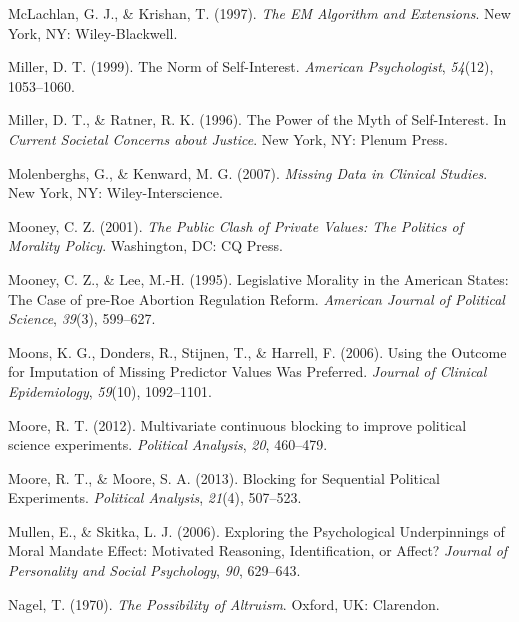 \documentclass[12pt,econ]{sources/authesis}
\begin{document}
\leavevmode\hypertarget{ref-mclachlan_1997_algorithm}{}%
McLachlan, G. J., \& Krishan, T. (1997). \emph{The EM Algorithm and Extensions}. New York, NY: Wiley-Blackwell.

\leavevmode\hypertarget{ref-miller_norm_1999}{}%
Miller, D. T. (1999). The Norm of Self-Interest. \emph{American Psychologist}, \emph{54}(12), 1053--1060.

\leavevmode\hypertarget{ref-miller_power_1996}{}%
Miller, D. T., \& Ratner, R. K. (1996). The Power of the Myth of Self-Interest. In \emph{Current Societal Concerns about Justice}. New York, NY: Plenum Press.

\leavevmode\hypertarget{ref-molenberghs_2007_missing}{}%
Molenberghs, G., \& Kenward, M. G. (2007). \emph{Missing Data in Clinical Studies}. New York, NY: Wiley-Interscience.

\leavevmode\hypertarget{ref-mooney_public_2001}{}%
Mooney, C. Z. (2001). \emph{The Public Clash of Private Values: The Politics of Morality Policy}. Washington, DC: CQ Press.

\leavevmode\hypertarget{ref-mooney_1995_legislative}{}%
Mooney, C. Z., \& Lee, M.-H. (1995). Legislative Morality in the American States: The Case of pre-Roe Abortion Regulation Reform. \emph{American Journal of Political Science}, \emph{39}(3), 599--627.

\leavevmode\hypertarget{ref-moons_2006_using}{}%
Moons, K. G., Donders, R., Stijnen, T., \& Harrell, F. (2006). Using the Outcome for Imputation of Missing Predictor Values Was Preferred. \emph{Journal of Clinical Epidemiology}, \emph{59}(10), 1092--1101.

\leavevmode\hypertarget{ref-moore_2012_multivariate}{}%
Moore, R. T. (2012). Multivariate continuous blocking to improve political science experiments. \emph{Political Analysis}, \emph{20}, 460--479.

\leavevmode\hypertarget{ref-moore_blocking_2013}{}%
Moore, R. T., \& Moore, S. A. (2013). Blocking for Sequential Political Experiments. \emph{Political Analysis}, \emph{21}(4), 507--523.

\leavevmode\hypertarget{ref-mullen_2006_exploring}{}%
Mullen, E., \& Skitka, L. J. (2006). Exploring the Psychological Underpinnings of Moral Mandate Effect: Motivated Reasoning, Identification, or Affect? \emph{Journal of Personality and Social Psychology}, \emph{90}, 629--643.

\leavevmode\hypertarget{ref-nagel_1970_possibility}{}%
Nagel, T. (1970). \emph{The Possibility of Altruism}. Oxford, UK: Clarendon.
\end{document}
